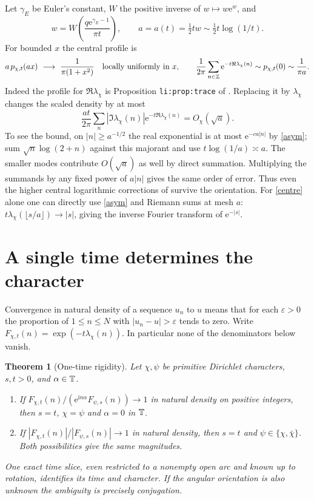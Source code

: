 \documentclass[11pt,letterpaper]{article}
\newcommand{\I}{\mathrm i}\newcommand{\e}{\mathrm e}
\theoremstyle{plain}
\newtheorem{theorem}{Theorem}[section]\newtheorem{lemma}[theorem]{Lemma}
\theoremstyle{definition}\newtheorem{example}[theorem]{Example}
\begin{document}
Let $\gamma_E$ be Euler's constant, $W$ the positive inverse of $w\mapsto w\e^w$, and
\begin{equation}\label{a}
 w=W\!\left(\frac{q\e^{\gamma_E-1}}{\pi t}\right),\qquad
 a=a(t)=\tfrac12 t w\sim\tfrac12 t\log(1/t).
\end{equation}
For bounded $x$ the central profile is
\begin{equation}\label{centre}
 a\,p_{\chi,t}(ax)\ \longrightarrow\ \frac{1}{\pi(1+x^2)}
 \quad\text{locally uniformly in }x,\qquad
 \frac1{2\pi}\sum_{n\in\Z}\e^{-t\Re\lambda_\chi(n)}
           \sim p_{\chi,t}(0)\sim\frac1{\pi a}.
\end{equation}
Indeed the profile for $\Re\lambda_\chi$ is Proposition \texttt{li:prop:trace} of \cite{article}. Replacing it by $\lambda_\chi$ changes the scaled density by at most
\[
 \frac{at}{2\pi}\sum_n|\Im\lambda_\chi(n)|\e^{-t\Re\lambda_\chi(n)}
       =O_\chi(\sqrt a).
\]
To see the bound, on $|n|\ge a^{-1/2}$ the real exponential is at most $\e^{-c a|n|}$ by \eqref{asym}; sum $\sqrt n\log(2+n)$ against this majorant and use $t\log(1/a)\asymp a$. The smaller modes contribute $O(\sqrt a)$ as well by direct summation. Multiplying the summands by any fixed power of $a|n|$ gives the same order of error. Thus even the higher central logarithmic corrections of \cite{article} survive the orientation. For \eqref{centre} alone one can directly use \eqref{asym} and Riemann sums at mesh $a$: $t\lambda_\chi(\lfloor s/a\rfloor)\to |s|$, giving the inverse Fourier transform of $\e^{-|s|}$.

\section{A single time determines the character}\label{inverse}
Convergence in natural density of a sequence $u_n$ to $u$ means that for each $\varepsilon>0$ the proportion of $1\le n\le N$ with $|u_n-u|>\varepsilon$ tends to zero. Write $F_{\chi,t}(n)=\exp(-t\lambda_\chi(n))$. In particular none of the denominators below vanish.

\begin{theorem}[One-time rigidity]\label{single}
Let $\chi,\psi$ be primitive Dirichlet characters, $s,t>0$, and $\alpha\in\mathbb T$.
\begin{enumerate}[label=\textup{(\roman*)}]
\item If $F_{\chi,t}(n)/(\e^{\I n\alpha}F_{\psi,s}(n))\to1$ in natural density on positive integers, then $s=t$, $\chi=\psi$ and $\alpha=0$ in $\mathbb T$.
\item If $|F_{\chi,t}(n)|/|F_{\psi,s}(n)|\to1$ in natural density, then $s=t$ and $\psi\in\{\chi,\bar\chi\}$. Both possibilities give the same magnitudes.
\end{enumerate}
One exact time slice, even restricted to a nonempty open arc and known up to rotation, identifies its time and character. If the angular orientation is also unknown the ambiguity is precisely conjugation.
\end{theorem}
\end{document}
